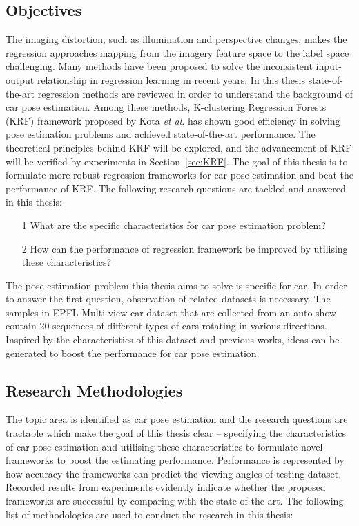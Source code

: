 \documentclass{tutmscthesis}[2010/09/22]
\numberwithin{equation}{section}
\numberwithin{table}{section}
\numberwithin{figure}{section}
\def\onedot{. }
\def\etal{\emph{et al}\onedot}
\begin{document}
\subsection{Objectives}

The imaging distortion, such as illumination and perspective changes, makes the regression approaches mapping from the imagery feature space to the label space challenging. 
Many methods have been proposed to solve the inconsistent input-output relationship in regression learning in recent years. 
In this thesis state-of-the-art regression methods are reviewed in order to understand the background of car pose estimation. 
Among these methods, K-clustering Regression Forests (KRF) framework  proposed by Kota \etal \cite{hara2014growing} has shown good efficiency in solving pose estimation problems and achieved state-of-the-art performance. 
The theoretical principles behind KRF will be explored, and the advancement of KRF will be verified by experiments in Section~\ref{sec:KRF}.
The goal of this thesis is to formulate more robust regression frameworks for car pose estimation and beat the performance of KRF.
The following research questions are tackled and answered in this thesis:

\begin{itemize}
\item[1] What are the specific characteristics for car pose estimation problem?
\item[2] How can the performance of regression framework be improved by utilising these characteristics?
\end{itemize}

The pose estimation problem this thesis aims to solve is specific for car.
In order to answer the first question, observation of related datasets is necessary.
The samples in EPFL Multi-view car dataset that are collected from an auto show contain 20 sequences of different types of cars rotating in various directions. 
Inspired by the characteristics of this dataset and previous works, ideas can be generated to boost the performance for car pose estimation. 



\subsection{Research Methodologies}

The topic area is identified as car pose estimation and the research questions are tractable which make the goal of this thesis clear -- specifying the characteristics of car pose estimation and utilising these characteristics to formulate novel frameworks to  boost the estimating performance. 
Performance is represented by how accuracy the frameworks can predict the viewing angles of testing dataset. 
Recorded results from experiments evidently indicate whether the proposed frameworks are successful by comparing with the state-of-the-art. The following list of methodologies are used to conduct the research in this thesis:
\end{document}
